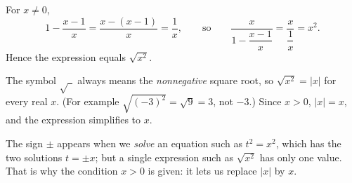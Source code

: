 For $x\ne0$,
\[1-\dfrac{x-1}{x}=\dfrac{x-(x-1)}{x}=\dfrac1x,\qquad\text{so}\qquad\dfrac{x}{1-\dfrac{x-1}{x}}=\dfrac{x}{\dfrac1x}=x^2.\]
Hence the expression equals $\sqrt{x^2}$.

The symbol $\sqrt{\ \ }$ always means the \emph{nonnegative} square root, so $\sqrt{x^2}=|x|$ for every real $x$. (For example $\sqrt{(-3)^2}=\sqrt9=3$, not $-3$.) Since $x>0$, $|x|=x$, and the expression simplifies to $\boxed{x}$.

The sign $\pm$ appears when we \emph{solve} an equation such as $t^2=x^2$, which has the two solutions $t=\pm x$; but a single expression such as $\sqrt{x^2}$ has only one value. That is why the condition $x>0$ is given: it lets us replace $|x|$ by $x$.

